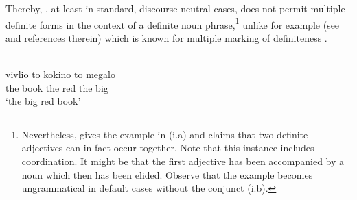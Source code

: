 \documentclass[output=paper,
modfonts
]{langscibook}
\begin{document}
\pagebreak Thereby, , at least in standard, discourse-neutral cases, does not permit multiple definite forms in the context of a definite noun phrase,\footnote{Nevertheless, \citet{Stolz2008} gives the example in (i.a) and claims that two definite adjectives can in fact occur together. Note that this instance includes coordination. It might be that the first adjective has been accompanied by a noun which then has been elided. Observe that the example becomes ungrammatical in default cases without the conjunct (i.b).
\ea   {}

\z 
\z\vspace*{-\baselineskip}} unlike for example  (see \citet{Alexiadou2014} and references therein) which is known for multiple marking of definiteness .

\begin{exe}
\ex \label{ex:sereikaite:10}
 \citep[19]{Alexiadou2014} \\
 {vivlio} {to} {kokino} {to} {megalo}\\
the book the red the big\\
\trans `the big red book' 
\end{exe}
\end{document}
